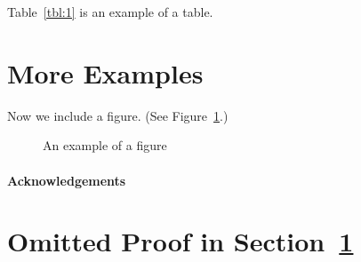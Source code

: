 Table~\ref*{tbl:1} is an example of a table.

\section{More Examples}
\label{sec:examples}

Now we include a figure.
(See Figure~\ref{fig:example}.)
\begin{figure}[ht]
	\centering
	\caption{An example of a figure}
	\label{fig:example}
\end{figure}

\paragraph{Acknowledgements} \lipsum[6]

\newpage


\appendix

\section{Omitted Proof in Section~\ref{sec:examples}}
\label{app:1}

\lipsum[7]

